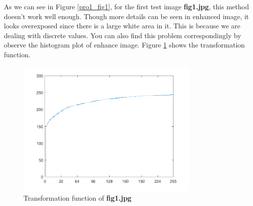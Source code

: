\documentclass[11pt,a4paper]{article}
\begin{document}
As we can see in
Figure \ref{pro1_fig1}, for the first test image \textbf{fig1.jpg}, this method doesn't work well
enough. Though more details can be seen in enhanced image, it looks overexposed since there is a 
large white area in it. This is because we are dealing with discrete values. You can also find this 
problem correspondingly by observe the histogram plot of enhance image. Figure \ref{pro1_fig2} shows
the transformation function.

\begin{figure}[!htbp]
	\centering
	\includegraphics[width=0.8\textwidth]{pro1/fig1_trans}
	\caption{Transformation function of \textbf{fig1.jpg}}
	\label{pro1_fig2}
\end{figure}
\end{document}
